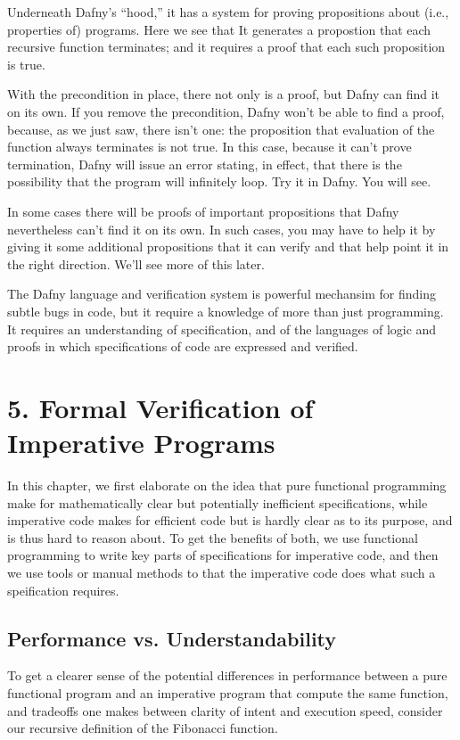 \documentclass[letterpaper,10pt,english]{sphinxmanual}
\begin{document}
Underneath Dafny’s “hood,” it has a system for proving propositions
about (i.e., properties of) programs. Here we see that It generates a
propostion that each recursive function terminates; and it requires a
proof that each such proposition is true.

With the precondition in place, there not only is a proof, but Dafny
can find it on its own. If you remove the precondition, Dafny won’t be
able to find a proof, because, as we just saw, there isn’t one: the
proposition that evaluation of the function always terminates is not
true. In this case, because it can’t prove termination, Dafny will
issue an error stating, in effect, that there is the possibility that
the program will infinitely loop. Try it in Dafny.  You will see.

In some cases there will be proofs of important propositions that
Dafny nevertheless can’t find it on its own. In such cases, you may
have to help it by giving it some additional propositions that it
can verify and that help point it in the right direction. We’ll see
more of this later.

The Dafny language and verification system is powerful mechansim for
finding subtle bugs in code, but it require a knowledge of more than
just programming. It requires an understanding of specification, and
of the languages of logic and proofs in which specifications of code
are expressed and verified.


\chapter{5. Formal Verification of Imperative Programs}
\label{\detokenize{05-verifying-logical-specifications::doc}}\label{\detokenize{05-verifying-logical-specifications:formal-verification-of-imperative-programs}}
In this chapter, we first elaborate on the idea that pure functional
programming make for mathematically clear but potentially inefficient
specifications, while imperative code makes for efficient code but is
hardly clear as to its purpose, and is thus hard to reason about. To
get the benefits of both, we use functional programming to write key
parts of specifications for imperative code, and then we use tools or
manual methods to  that the imperative code does what such a
speification requires.


\section{Performance vs. Understandability}
\label{\detokenize{05-verifying-logical-specifications:performance-vs-understandability}}
To get a clearer sense of the potential differences in performance
between a pure functional program and an imperative program that
compute the same function, and tradeoffs one makes between clarity of
intent and execution speed, consider our recursive definition of the
Fibonacci function.
\end{document}
